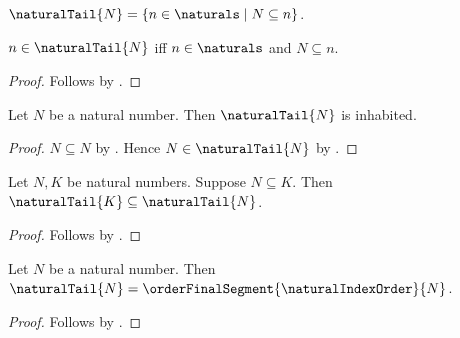 \begin{definition}\label{natural_tail}
    $\naturalTail{N}=\{n\in\naturals\mid N\subseteq n\}$.
\end{definition}

\begin{proposition}\label{natural_tail_iff}
    $n\in\naturalTail{N}$ iff
        $n\in\naturals$ and $N\subseteq n$.
\end{proposition}
\begin{proof}
    Follows by .
\end{proof}

\begin{proposition}\label{natural_tail_inhabited}
    Let $N$ be a natural number.
    Then $\naturalTail{N}$ is inhabited.
\end{proposition}
\begin{proof}
    $N\subseteq N$ by .
    Hence $N\in\naturalTail{N}$ by .
\end{proof}

\begin{proposition}\label{natural_tail_antitone}
    Let $N,K$ be natural numbers.
    Suppose $N\subseteq K$.
    Then $\naturalTail{K}\subseteq\naturalTail{N}$.
\end{proposition}
\begin{proof}
    Follows by
        .
\end{proof}

\begin{proposition}\label{natural_tail_is_order_final_segment}
    Let $N$ be a natural number.
    Then $\naturalTail{N}=\orderFinalSegment{\naturalIndexOrder}{N}$.
\end{proposition}
\begin{proof}
    Follows by
        .
\end{proof}

